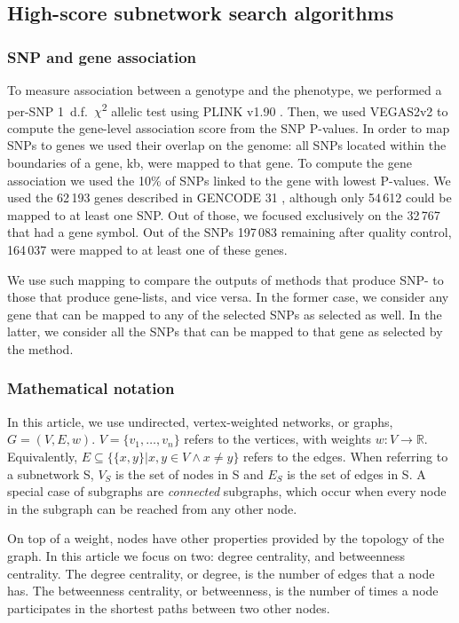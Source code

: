 \documentclass[twocolumn, 10pt]{article}
\begin{document}
\subsection{High-score subnetwork search algorithms}
\subsubsection{SNP and gene association}
\label{methods:node_score}
To measure association between a genotype and the phenotype, we performed a per-SNP 1~d.f.~\(\chi\)\textsuperscript{2} allelic test using PLINK v1.90 \cite{chang_second-generation_2015}. Then, we used VEGAS2v2 to compute the gene-level association score \cite{mishra_vegas2:_2015} from the SNP P-values. In order to map SNPs to genes we used their overlap on the genome: all SNPs located within the boundaries of a gene,  kb, were mapped to that gene. To compute the gene association we used the 10\% of SNPs linked to the gene with lowest P-values. We used the 62\,193 genes described in GENCODE 31 \cite{frankish_gencode_2019}, although only 54\,612 could be mapped to at least one SNP. Out of those, we focused exclusively on the 32\,767 that had a gene symbol. Out of the SNPs 197\,083 remaining after quality control, 164\,037 were mapped to at least one of these genes. 

We use such mapping to compare the outputs of methods that produce SNP- to those that produce gene-lists, and vice versa. In the former case, we consider any gene that can be mapped to any of the selected SNPs as selected as well. In the latter, we consider all the SNPs that can be mapped to that gene as selected by the method.

\subsubsection{Mathematical notation}
\label{methods:notation}
In this article, we use undirected, vertex-weighted networks, or graphs, $G = (V,E,w)$. $V = \{v_{1}, \dots{}, v_{n}\}$ refers to the vertices, with weights $w: V \rightarrow \mathbb{R}$. Equivalently, $E \subseteq \{\{x,y\} | x,y \in V \wedge x \neq y\}$ refers to the edges. When referring to a subnetwork S, $V_{S}$ is the set of nodes in S and $E_{S}$ is the set of edges in S. A special case of subgraphs are \emph{connected} subgraphs, which occur when every node in the subgraph can be reached from any other node.

On top of a weight, nodes have other properties provided by the topology of the graph. In this article we focus on two: degree centrality, and betweenness centrality. The degree centrality, or degree, is the number of edges that a node has. The betweenness centrality, or betweenness, is the number of times a node participates in the shortest paths between two other nodes.
\end{document}
